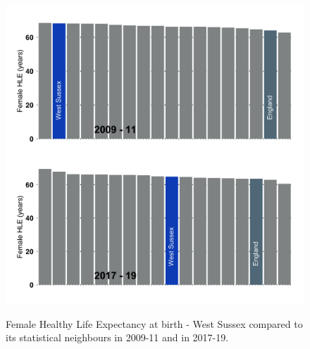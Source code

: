 \begin{figure}[htp]
    \caption{Female Healthy Life Expectancy at birth - West Sussex compared to its statistical neighbours in 2009-11 and in 2017-19.}
    \centering
	\includegraphics[width=.9\linewidth]{images/hle_cipfa.png}
	\label{fig:hle_cipfa}
\end{figure}


